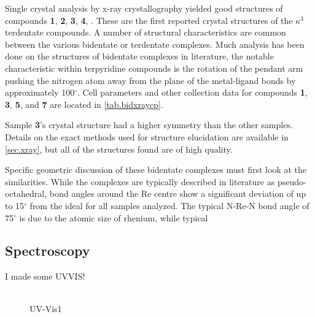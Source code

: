 Single crystal analysis by x-ray crystallography yielded good structures of compounds \textbf{1}, \textbf{2}, \textbf{3}, \textbf{4}, . These are the first reported crystal structures of the $\kappa ^3$ terdentate  compounds. A number of structural characteristics are common between the various bidentate or terdentate complexes. Much analysis has been done on the structures of bidentate complexes in literature, the notable characteristic within terpyridine compounds is the rotation of the pendant arm pushing the nitrogen atom away from the plane of the metal-ligand bonds by approximately 100$^\circ$. Cell parameters and other collection data for compounds \textbf{1}, \textbf{3}, \textbf{5}, and \textbf{7} are located in \autoref{tab.bidxraycp}.



Sample \textbf{3}'s crystal structure had a higher symmetry than the other samples. Details on the exact methods used for structure elucidation are available in \autoref{sec.xray}, but all of the structures found are of high quality. 

Specific geometric discussion of these bidentate complexes must first look at the similarities. While the complexes are typically described in literature as pseudo-octahedral, bond angles around the Re centre show a significant deviation of up to 15$^\circ$ from the ideal for all samples analyzed. The typical N-Re-N bond angle of 75$^\circ$ is due to the atomic size of rhenium, while typical 

\subsection{Spectroscopy}


I made some UVVIS!

\begin{figure}[!htbp]
 \begin{center}
  \includegraphics[clip=true]{images/insertgraphic.eps}
 \end{center}
\caption{UV-Vis1}
\label{fig.uvvis1}
\end{figure} 

